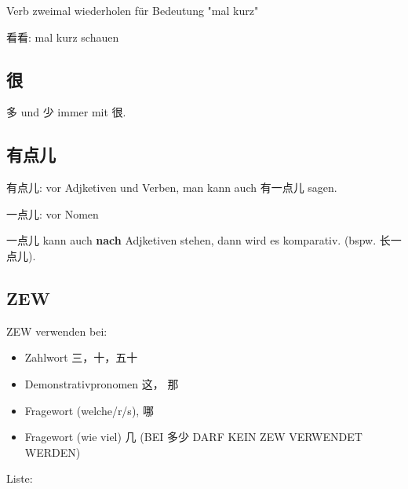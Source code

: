 \documentclass[UTF8]{ctexart}
\begin{document}
Verb zweimal wiederholen für Bedeutung "mal kurz"

看看: mal kurz schauen

\subsection{很}

多 und 少 immer mit 很.

\subsection{有点儿}

有点儿: vor Adjketiven und Verben, man kann auch 有一点儿 sagen.

一点儿: vor Nomen

一点儿 kann auch \textbf{nach} Adjketiven stehen, dann wird es komparativ. (bspw. 长一点儿). 


\subsection{ZEW}

ZEW verwenden bei:

\begin{itemize}
    \item Zahlwort 三，十，五十
    \item Demonstrativpronomen 这， 那
    \item Fragewort (welche/r/s), 哪
    \item Fragewort (wie viel) 几 (BEI 多少 DARF KEIN ZEW VERWENDET WERDEN)
\end{itemize}

Liste:
\end{document}
